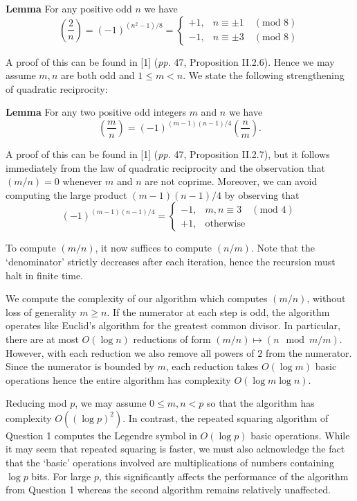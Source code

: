 \documentclass[12pt]{article}
\newcommand{\mathmod}[1]{\quad(\text{mod }#1)}
\begin{document}
\textbf{Lemma} For any positive odd \(n\) we have
\[\left(\frac{2}{n}\right) = (-1)^{(n^2-1)/8}= \begin{cases} +1, &n \equiv \pm1
    \mathmod{8} \\ 
-1, &n\equiv \pm 3 \mathmod{8}\end{cases}\]

A proof of this can be found in [1] (\textit{pp.} 47, Proposition
II.2.6). Hence we may assume \(m,n\) are both odd and \(1\leq m<n\). We state the following strengthening of quadratic reciprocity: 

\textbf{Lemma} For any two positive odd integers \(m\) and \(n\) we have
\[\left(\frac{m}{n}\right) = (-1)^{(m-1)(n-1)/4}\left(\frac{n}{m}\right).\]

A proof of this can be found in [1] (\textit{pp.} 47, Proposition
II.2.7), but it follows immediately from the law of quadratic reciprocity and
the observation that \((m/n)=0\) whenever \(m\) and \(n\) are not coprime.
Moreover, we can avoid computing the large product \((m-1)(n-1)/4\) by observing
that 
\[(-1)^{(m-1)(n-1)/4} = \begin{cases}
    -1, & m,n\equiv 3 \quad(\text{mod }4) \\
    +1, &\text{otherwise}
\end{cases}\] 

To compute \((m/n)\), it now suffices to compute \((n/m)\). Note that the
`denominator' strictly decreases after each iteration, hence the recursion must
halt in finite time.

We compute the complexity of our algorithm which computes \((m/n)\), without
loss of generality \(m\geq n\). If the numerator at each step is odd, the
algorithm operates like Euclid's algorithm for the greatest common divisor. In
particular, there are at most \(O(\log n)\) reductions of form \((m/n)\mapsto (n
\mod m / m)\). However, with each reduction we also remove all powers of \(2\)
from the numerator. Since the numerator is bounded by \(m\), each reduction
takes \(O(\log m)\) basic operations hence the entire algorithm has complexity
\(O(\log m \log n)\).

Reducing mod \(p\), we may assume \(0\leq m,n < p\) so that the algorithm has
complexity \(O((\log p)^2)\). In contrast, the repeated squaring algorithm of
Question 1 computes the Legendre symbol in \(O(\log p)\) basic operations. While
it may seem that repeated squaring is faster, we must also acknowledge the
fact that the `basic' operations involved are multiplications of numbers
containing \(\log p\) bits. For large \(p\), this significantly affects the
performance of the algorithm from Question 1 whereas the second algorithm
remains relatively unaffected.
\end{document}
